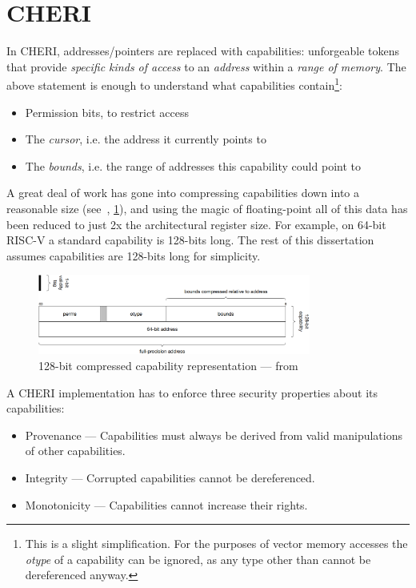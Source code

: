 \section{CHERI}\label{chap:bg:sec:cheri}
In CHERI, addresses/pointers are replaced with capabilities: unforgeable tokens that provide \emph{specific kinds of access} to an \emph{address} within a \emph{range of memory}.
The above statement is enough to understand what capabilities contain\footnote{This is a slight simplification. For the purposes of vector memory accesses the \emph{otype} of a capability can be ignored, as any type other than  cannot be dereferenced anyway.}:
\begin{itemize}
    \item Permission bits, to restrict access
    \item The \emph{cursor}, i.e. the address it currently points to
    \item The \emph{bounds}, i.e. the range of addresses this capability could point to
\end{itemize}
A great deal of work has gone into compressing capabilities down into a reasonable size (see~\cite{woodruffCHERIConcentratePractical2019}, \cref{cheri:compressedcap}), and using the magic of floating-point all of this data has been reduced to just 2x the architectural register size.
For example, on 64-bit RISC-V a standard capability is 128-bits long.
The rest of this dissertation assumes capabilities are 128-bits long for simplicity.

\begin{figure}[b]
    \centering
    \includegraphics[width=0.8\textwidth]{./figures/cheri_compressed_cap.png}
    \caption{128-bit compressed capability representation --- from \cite{TR-941}}\label{cheri:compressedcap}
\end{figure}

A CHERI implementation has to enforce three security properties about its capabilities\cite[Section 1.2.1]{TR-951}:
\begin{itemize}
    \item Provenance --- Capabilities must always be derived from valid manipulations of other capabilities.
    \item Integrity --- Corrupted capabilities cannot be dereferenced.
    \item Monotonicity --- Capabilities cannot increase their rights.
\end{itemize}

